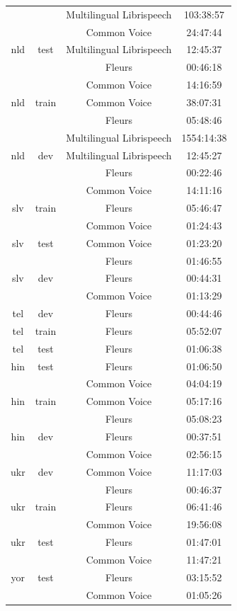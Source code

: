\begin{longtable}{cccc}
 & & Multilingual Librispeech & 103:38:57 \\ 
 & & Common Voice & 24:47:44 \\ \midrule
nld & test & Multilingual Librispeech & 12:45:37 \\ 
 & & Fleurs & 00:46:18 \\ 
 & & Common Voice & 14:16:59 \\ 
nld & train & Common Voice & 38:07:31 \\ 
 & & Fleurs & 05:48:46 \\ 
 & & Multilingual Librispeech & 1554:14:38 \\ 
nld & dev & Multilingual Librispeech & 12:45:27 \\ 
 & & Fleurs & 00:22:46 \\ 
 & & Common Voice & 14:11:16 \\ \midrule
slv & train & Fleurs & 05:46:47 \\ 
 & & Common Voice & 01:24:43 \\ 
slv & test & Common Voice & 01:23:20 \\ 
 & & Fleurs & 01:46:55 \\ 
slv & dev & Fleurs & 00:44:31 \\ 
 & & Common Voice & 01:13:29 \\ \midrule
tel & dev & Fleurs & 00:44:46 \\ 
tel & train & Fleurs & 05:52:07 \\ 
tel & test & Fleurs & 01:06:38 \\ \midrule
hin & test & Fleurs & 01:06:50 \\ 
 & & Common Voice & 04:04:19 \\ 
hin & train & Common Voice & 05:17:16 \\ 
 & & Fleurs & 05:08:23 \\ 
hin & dev & Fleurs & 00:37:51 \\ 
 & & Common Voice & 02:56:15 \\ \midrule
ukr & dev & Common Voice & 11:17:03 \\ 
 & & Fleurs & 00:46:37 \\ 
ukr & train & Fleurs & 06:41:46 \\ 
 & & Common Voice & 19:56:08 \\ 
ukr & test & Fleurs & 01:47:01 \\ 
 & & Common Voice & 11:47:21 \\ \midrule
yor & test & Fleurs & 03:15:52 \\ 
 & & Common Voice & 01:05:26 \\ 

\end{longtable}

